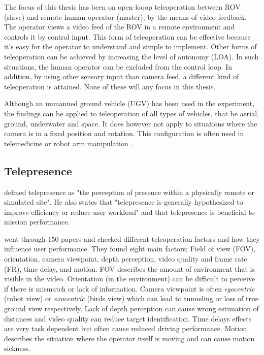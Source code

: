 The focus of this thesis has been on open-looop teleoperation between ROV (slave) and remote human operator (master), by the means of video feedback. The operator views a video feed of the ROV in a remote environment and controls it by control input. This form of teleoperation can be effective because it's easy for the operator to understand and simple to implement. Other forms of teleoperation can be achieved by increasing the level of autonomy (LOA). In such situations, the human operator can be excluded from the control loop. In addition, by using other sensory input than camera feed, a different kind of teleoperation is attained. None of these will any focus in this thesis.

Although an unmanned ground vehicle (UGV) has been used in the experiment, the findings can be applied to teleoperation of all types of vehicles, that be aerial, ground, underwater and space. It does however not apply to situations where the camera is in a fixed position and rotation. This configuration is often used in telemedicine \citep{Kumcu2017} or robot arm manipulation \citep{Bejczy1990}.

\subsection{Telepresence}

\citet{Draper1998} defined telepresence as "the perception of presence within a physically remote or simulated site". He also states that "telepresence is generally hypothesized to improve efficiency or reduce user workload" and that telepresence is beneficial to mission performance.

\citet{Chen2007} went through 150 papers and checked different teleoperation factors and how they influence user performance. They found eight main factors; Field of view (FOV), orientation, camera viewpoint, depth perception, video quality and frame rate (FR), time delay, and motion. FOV describes the amount of environment that is visible in the video. Orientation (in the environment) can be difficult to perceive if there is mismatch or lack of information. Camera viewpoint is often \emph{egocentric} (robot view) or \emph{exocentric} (birds view) which can lead to tunneling or loss of true ground view respectively. Lack of depth perception can cause wrong estimation of distances and video quality can reduce target identification. Time delays effects are very task dependent but often cause reduced driving performance. Motion describes the situation where the operator itself is moving and can cause motion sickness.


